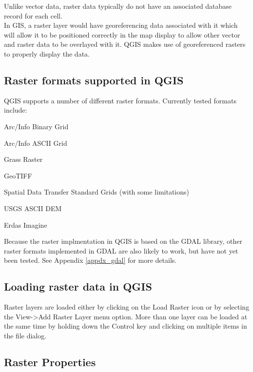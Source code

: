 \documentclass[10pt,english]{article}
\begin{document}
\begin{onehalfspace}
Unlike vector data, raster data typically do not have an associated database record for each cell.\\

In GIS, a raster layer would have georeferencing data associated with it which
will allow it to be positioned correctly in the map display to allow other
vector and raster data to be overlayed with it. QGIS makes use of georeferenced
rasters to properly display the data.
	
\subsection{Raster formats supported in QGIS}
QGIS supports a number of different raster formats. Currently tested formats
include:
\begin{compactitem}
\item Arc/Info Binary Grid
\item Arc/Info ASCII Grid
\item Grass Raster
\item GeoTIFF
\item Spatial Data Transfer Standard Grids (with some limitations)
\item USGS ASCII DEM
\item Erdas Imagine
\end{compactitem}
Because the raster implmentation in QGIS is based on the GDAL library, other
raster formats implemented in GDAL are also likely to work, but have not yet
been tested. See Appendix \ref{appdx_gdal} for more
details.
	
\subsection{Loading raster data in QGIS}
Raster layers are
loaded either by clicking on the Load Raster icon or by selecting the View->Add
Raster Layer menu option. More than one layer can be loaded at the same time by
holding down the Control key and clicking on multiple items in the file
dialog.\\
	
\subsection{Raster Properties}


\end{onehalfspace}
\end{document}

